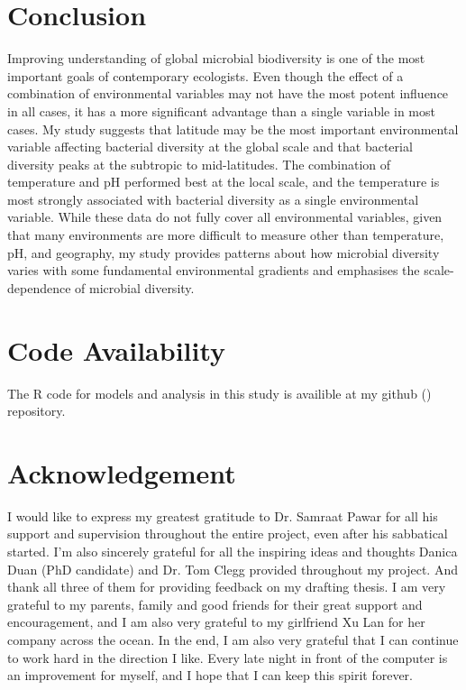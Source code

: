 \documentclass[11pt, a4paper]{article}
\begin{document}
\begin{spacing}{1.5}
\section{Conclusion}

Improving understanding of global microbial biodiversity is one of the most important goals of contemporary ecologists. Even though the effect of a combination of environmental variables may not have the most potent influence in all cases, it has a more significant advantage than a single variable in most cases. My study suggests that latitude may be the most important environmental variable affecting bacterial diversity at the global scale and that bacterial diversity peaks at the subtropic to mid-latitudes. The combination of temperature and pH performed best at the local scale, and the temperature is most strongly associated with bacterial diversity as a single environmental variable. While these data do not fully cover all environmental variables, given that many environments are more difficult to measure other than temperature, pH, and geography, my study provides patterns about how microbial diversity varies with some fundamental environmental gradients and emphasises the scale-dependence of microbial diversity.

\section*{Code Availability}

The R code for models and analysis in this study is availible at my github (\href{https://github.com/ChuxuanJi/EECProject1}{}) repository.

\section*{Acknowledgement}

I would like to express my greatest gratitude to Dr. Samraat Pawar for all his support and supervision throughout the entire project, even after his sabbatical started. I'm also sincerely grateful for all the inspiring ideas and thoughts Danica Duan (PhD candidate) and Dr. Tom Clegg provided throughout my project. And thank all three of them for providing feedback on my drafting thesis. I am very grateful to my parents, family and good friends for their great support and encouragement, and I am also very grateful to my girlfriend Xu Lan for her company across the ocean. In the end, I am also very grateful that I can continue to work hard in the direction I like. Every late night in front of the computer is an improvement for myself, and I hope that I can keep this spirit forever. 



\clearpage



\end{spacing}
\end{document}
